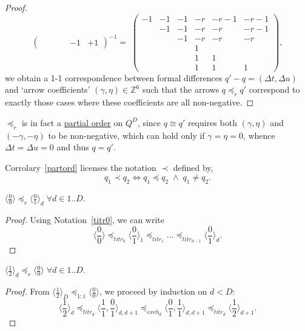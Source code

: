 \documentclass{article}
\begin{document}
\begin{proof}
$$\begin{pmatrix}
       &    &    &    & -1 & +1
  \end{pmatrix}^{-1} =\;
  \begin{pmatrix}
    -1 & -1 & -1 & -r & -r-1 & -r-1 \\
       & -1 & -1 & -r & -r   & -r-1 \\
       &    & -1 & -r & -r   & -r \\
       &    &    &  1 &      &    \\
       &    &    &  1 &  1   &    \\
       &    &    &  1 &  1   &  1
  \end{pmatrix},
  $$
  we obtain a 1-1 correspondence between formal differences $q' - q = (\Delta t,\Delta u)$ and `arrow coefficients' $(\gamma,\eta) \in \mathbb{Z}^6$ such that the arrows $q \preceq_r q'$ correspond to exactly those cases where these coefficients are all non-negative.
\end{proof}

\begin{corr}\label{partord}
  $\preceq_r$ is in fact a \underline{partial order} on $Q^D$, since $q \cong q'$ requires both $(\gamma,\eta)$ and $(-\gamma,-\eta)$ to be non-negative, which can hold only if $\gamma = \eta = 0$, whence $\Delta t = \Delta u = 0$ and thus $q = q'$.
\end{corr}

\begin{nota}
  Corrolary~\ref{partord} licenses the notation $\prec$ defined by,
  $$
  q_1 \prec q_2 \iff q_1 \preceq q_2 \;\wedge\; q_1 \neq q_2.
  $$
\end{nota}

\begin{fact}\label{tol_d}
  $\langle\frac{0}{0}\rangle \preceq_r \langle\frac{0}{1}\rangle_d \;\forall d\in 1..D$.
\end{fact}
\begin{proof}
  Using Notation~\ref{titr0}, we can write
  $$
  \langle\frac{0}{0}\rangle \preceq_{titr_0} \langle\frac{0}{1}\rangle_1 \preceq_{titr_1} ...  \preceq_{titr_{d-1}} \langle\frac{0}{1}\rangle_d.
  $$
\end{proof}

\begin{fact}\label{d11}
  $\langle\frac{1}{2}\rangle_d \preceq_r \langle\frac{0}{0}\rangle \;\forall d\in 1..D$.
\end{fact}
\begin{proof}
  From $\langle\frac{1}{2}\rangle_D \preceq_{1:1} \langle\frac{0}{0}\rangle$, we proceed by induction on $d<D$:
  $$
  \langle\frac{1}{2}\rangle_d \preceq_{titr_d} \langle\frac{1}{1},\frac{0}{1}\rangle_{d,d+1} \preceq_{exch_d} \langle\frac{0}{1},\frac{1}{1}\rangle_{d,d+1} \preceq_{titr_d} \langle\frac{1}{2}\rangle_{d+1}.
  $$
\end{proof}
\end{document}
